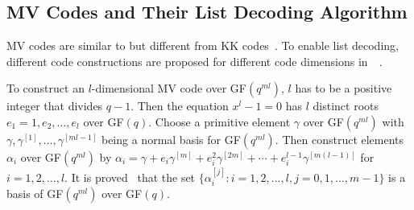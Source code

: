 \documentclass[11pt,onecolumn,draftcls]{IEEEtran}
\begin{document}
\subsection{MV Codes and Their List Decoding Algorithm}
\label{sec: introMV}
MV codes are similar to but different from KK codes~\cite{kotter_it08}. To enable list decoding, different code constructions are proposed for different code dimensions in~\cite{mahdavifar_isit10}~\cite{mahdavifar_it10}.

To construct an $l$-dimensional MV code over GF$(q^{ml})$, $l$ has to be a positive integer that divides $q-1$. Then the equation $x^l - 1 = 0$ has $l$ distinct roots $e_1  = 1, e_2, \ldots, e_l$ over GF$(q)$. Choose a primitive element $\gamma$ over GF$(q^{ml})$ with $\gamma, \gamma^{[1]},\ldots,\gamma^{[ml-1]}$ being a normal basis for GF$(q^{ml})$. Then construct elements $\alpha_i$ over GF$(q^{ml})$ by $\alpha_i = \gamma + e_i \gamma^{[m]} + e_i^2 \gamma^{[2m]} + \cdots + e_i^{l-1}\gamma^{[m(l-1)]}$ for $i = 1,2, \ldots, l$. It is proved~\cite{mahdavifar_it10} that the set $\{ \alpha_i^{[j]} : i = 1,2,\ldots, l, j = 0,1, \ldots, m-1\}$ is a basis of GF$(q^{ml})$ over GF$(q)$.
\end{document}
